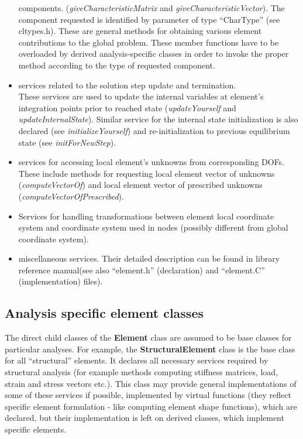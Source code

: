 \documentclass[a4paper]{article}
\newcommand{\class}[1]{{\bf #1}}
\newcommand{\service}[1]{{\em #1}}
\newcommand{\file}[1]{``#1''}
\newcommand{\refman}{\oofem library reference manual}
\begin{document}
\begin{itemize}
components. (\service{giveCharacteristicMatrix} and
\service{giveCharacteristicVector}). 
The component requested is identified by parameter of type
``CharType'' (see cltypes.h). These are general methods for obtaining various element
contributions to the global problem. These member functions have to
be overloaded by derived analysis-specific 
classes in order to invoke the proper method according to the type of
requested component.
\item
services related to the solution step update and termination.\\
These services are used to update the internal variables at
element's integration points prior to reached state
(\service{updateYourself} and \service{updateInternalState}).
Similar service for the internal state initialization is also declared
(see \service{initializeYourself}) and re-initialization to previous
equilibrium state (see \service{initForNewStep}).
\item
services for accessing local element's unknowns from corresponding DOFs.
These include methods for requesting local element vector of unknowns
(\service{computeVectorOf}) and local element vector of prescribed
unknowns (\service{computeVectorOfPrescribed}).
\item
Services for handling transformations between element local coordinate
system and coordinate system used in nodes (possibly different from
global coordinate system).  
\item
miscellaneous services. Their detailed description can be found in
\refman (see also \file{element.h} (declaration) and
\file{element.C} (implementation) files).

\end{itemize}

\subsection{Analysis specific element classes}
The direct child classes of the \class{Element} class are assumed to be base
classes for particular analyses. For example, the
\class{StructuralElement} class is the base class for all ``structural''
elements. It declares all necessary services required by structural
analysis (for example methods computing stiffness  matrices, load,
strain and stress  vectors etc.). This class may provide general
implementations of some of these services if possible, implemented
by virtual functions (they reflect specific element formulation
- like computing element shape functions), which are declared, but
their implementation is left on derived classes, which implement specific
elements.
\end{document}
